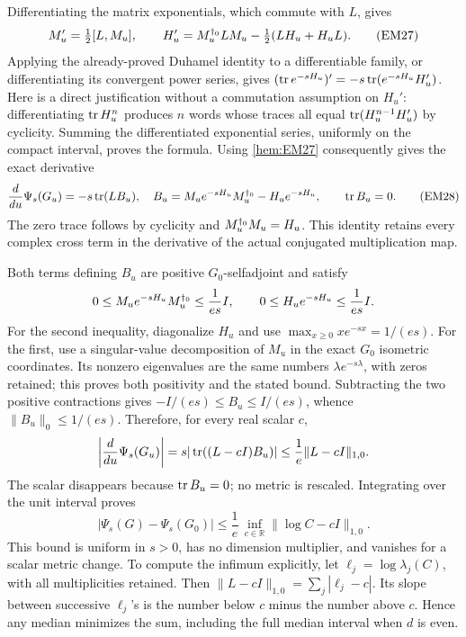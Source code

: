 \documentclass[11pt]{article}
\begin{document}
Differentiating the matrix exponentials, which commute with \(L\), gives
\begin{equation}
 M_u'=\tfrac12[L,M_u],\qquad
 H_u'=M_u^{\dagger_0}LM_u-\tfrac12(LH_u+H_uL).
 \tag{EM27}\label{hem:EM27}
\end{equation}
Applying the already-proved Duhamel identity to a differentiable family,
or differentiating its convergent power series, gives
\((\operatorname{tr} e^{-sH_u})'=-s\operatorname{tr}(e^{-sH_u}H_u')\).
Here is a direct justification without a commutation assumption on
\(H_u'\): differentiating \(\operatorname{tr} H_u^n\) produces \(n\) words whose traces
all equal \(\operatorname{tr}(H_u^{n-1}H_u')\) by cyclicity. Summing the differentiated
exponential series, uniformly on the compact interval, proves the formula.
Using \eqref{hem:EM27} consequently gives the exact derivative
\begin{equation}
 \frac{d}{du}\Psi_s(G_u)
  =-s\operatorname{tr}(L B_u),\quad
 B_u=M_u e^{-sH_u}M_u^{\dagger_0}-H_u e^{-sH_u},
 \qquad \operatorname{tr} B_u=0.
 \tag{EM28}\label{hem:EM28}
\end{equation}
The zero trace follows by cyclicity and \(M_u^{\dagger_0}M_u=H_u\).
This identity retains every complex cross term in the derivative of
the actual conjugated multiplication map.

Both terms defining \(B_u\) are positive \(G_0\)-selfadjoint and satisfy
\[
 0\le M_u e^{-sH_u}M_u^{\dagger_0}\le\frac1{es}I,\qquad
 0\le H_u e^{-sH_u}\le\frac1{es}I.
\]
For the second inequality, diagonalize \(H_u\) and use
\(\max_{x\ge0}x e^{-sx}=1/(es)\).
For the first, use a singular-value decomposition of \(M_u\) in the
exact \(G_0\) isometric coordinates. Its nonzero eigenvalues are
the same numbers \(\lambda e^{-s\lambda}\), with zeros retained;
this proves both positivity and the stated bound.
Subtracting the two positive contractions gives
\(-I/(es)\le B_u\le I/(es)\), whence \(\|B_u\|_0\le1/(es)\).
Therefore, for every real scalar \(c\),
\[
 \left|\frac{d}{du}\Psi_s(G_u)\right|
  =s|\operatorname{tr}((L-cI)B_u)|
  \le\frac1e\|L-cI\|_{1,0}.
\]
The scalar disappears because \(\operatorname{tr} B_u=0\); no metric is rescaled.
Integrating over the unit interval proves
\begin{equation}
 |\Psi_s(G)-\Psi_s(G_0)|
 \le\frac1e\,\inf_{c\in\mathbb R}\|\log C-cI\|_{1,0}.
 \tag{EM29}\label{hem:EM29}
\end{equation}
This bound is uniform in \(s>0\), has no dimension multiplier, and
vanishes for a scalar metric change. To compute the infimum explicitly,
let \(\ell_j=\log\lambda_j(C)\), with all multiplicities retained.
Then \(\|L-cI\|_{1,0}=\sum_j|\ell_j-c|\). Its slope between successive
\(\ell_j\)'s is the number below \(c\) minus the number above \(c\).
Hence any median minimizes the sum, including the full median interval
when \(d\) is even.
\end{document}
